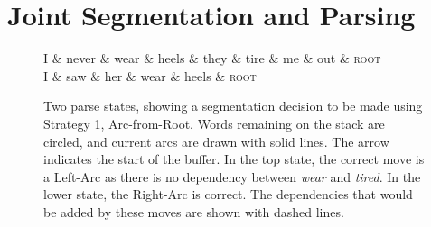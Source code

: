 \documentclass[11pt,letterpaper]{article}
\begin{document}
\section{Joint Segmentation and Parsing}

%

\begin{figure}
\begin{dependency}[theme=simple, edge unit distance=1.0ex]
    \begin{deptext}[row sep=2.0ex]
        I \& never \& wear \& heels \& they \& tire \& me \& out \& \textsc{root} \\
        I \& saw \& her \& wear \& heels \& \textsc{root} \\
    \end{deptext}




    \end{dependency}
    \vspace*{-2em}
\caption{\small Two parse states, showing a segmentation decision to be made using
    Strategy 1, Arc-from-Root.
    Words remaining on the stack are
    circled, and current arcs are drawn with solid lines.  The arrow indicates
    the start of the buffer.  In the top state, the correct move is a Left-Arc
    as there is no dependency between \emph{wear} and \emph{tired}.  In the
    lower state, the Right-Arc is correct.  The  dependencies that would be
added by these moves are shown with dashed lines.\label{fig:left_state}}
\vspace*{-3em}
\end{figure}
\end{document}
